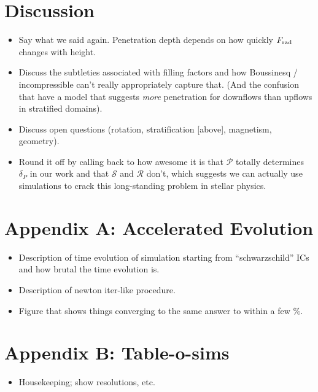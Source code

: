 \documentclass[12pt, fullpage]{article}
\begin{document}
\section{Discussion}
\begin{itemize}
\item Say what we said again.
Penetration depth depends on how quickly $F_{\rm{rad}}$ changes with height.
\item Discuss the subtleties associated with filling factors and how Boussinesq / incompressible can't really appropriately capture that.
(And the confusion that \citet{massaguer_etal_1984} have a model that suggests \emph{more} penetration for downflows than upflows in stratified domains).
\item Discuss open questions (rotation, stratification [above], magnetism, geometry).
\item Round it off by calling back to how awesome it is that $\mathcal{P}$ totally determines $\delta_P$ in our work and that $\mathcal{S}$ and $\mathcal{R}$ don't, which suggests we can actually use simulations to crack this long-standing problem in stellar physics.
\end{itemize}

\section{Appendix A: Accelerated Evolution}
\begin{itemize}
\item Description of time evolution of simulation starting from ``schwarzschild'' ICs and how brutal the time evolution is.
\item Description of newton iter-like procedure.
\item Figure that shows things converging to the same answer to within a few \%.
\end{itemize}

\section{Appendix B: Table-o-sims}
\begin{itemize}
\item Housekeeping; show resolutions, etc.
\end{itemize}


\setlength{\bibsep}{0pt plus 0.3ex}

\end{document}
